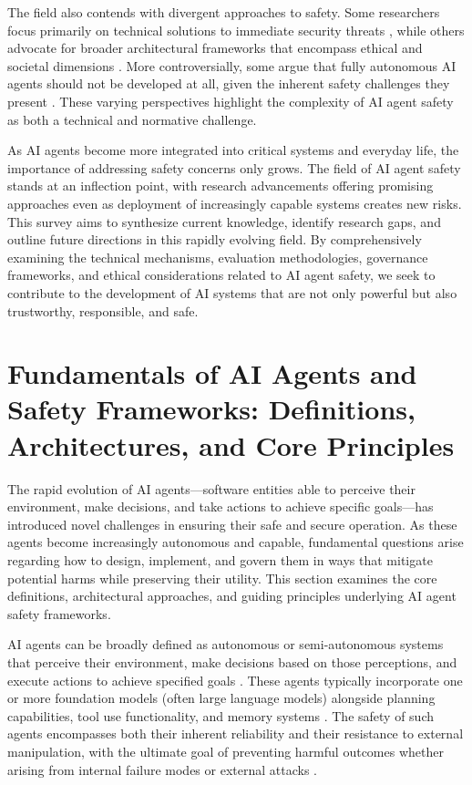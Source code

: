 \documentclass[conference]{IEEEtran}
\begin{document}
The field also contends with divergent approaches to safety. Some researchers focus primarily on technical solutions to immediate security threats \cite{2406.08689, 2504.16110}, while others advocate for broader architectural frameworks that encompass ethical and societal dimensions \cite{2408.12935, 2410.06946}. More controversially, some argue that fully autonomous AI agents should not be developed at all, given the inherent safety challenges they present \cite{2502.02649}. These varying perspectives highlight the complexity of AI agent safety as both a technical and normative challenge.

As AI agents become more integrated into critical systems and everyday life, the importance of addressing safety concerns only grows. The field of AI agent safety stands at an inflection point, with research advancements offering promising approaches even as deployment of increasingly capable systems creates new risks. This survey aims to synthesize current knowledge, identify research gaps, and outline future directions in this rapidly evolving field. By comprehensively examining the technical mechanisms, evaluation methodologies, governance frameworks, and ethical considerations related to AI agent safety, we seek to contribute to the development of AI systems that are not only powerful but also trustworthy, responsible, and safe.



\section{Fundamentals of AI Agents and Safety Frameworks: Definitions, Architectures, and Core Principles}

The rapid evolution of AI agents—software entities able to perceive their environment, make decisions, and take actions to achieve specific goals—has introduced novel challenges in ensuring their safe and secure operation. As these agents become increasingly autonomous and capable, fundamental questions arise regarding how to design, implement, and govern them in ways that mitigate potential harms while preserving their utility. This section examines the core definitions, architectural approaches, and guiding principles underlying AI agent safety frameworks.

AI agents can be broadly defined as autonomous or semi-autonomous systems that perceive their environment, make decisions based on those perceptions, and execute actions to achieve specified goals \cite{2503.12687}. These agents typically incorporate one or more foundation models (often large language models) alongside planning capabilities, tool use functionality, and memory systems \cite{2406.08689}. The safety of such agents encompasses both their inherent reliability and their resistance to external manipulation, with the ultimate goal of preventing harmful outcomes whether arising from internal failure modes or external attacks \cite{2405.19524}.
\end{document}
